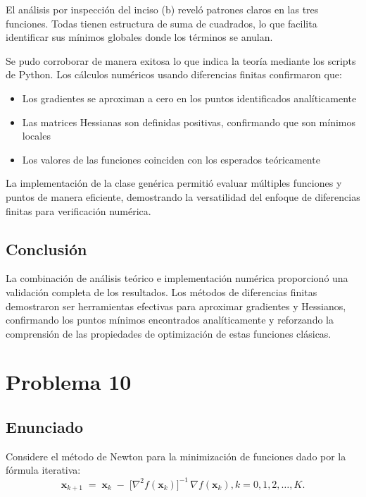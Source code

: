 \documentclass{article}
\begin{document}
El análisis por inspección del inciso (b) reveló patrones claros en las tres funciones. Todas tienen estructura de suma de cuadrados, lo que facilita identificar sus mínimos globales donde los términos se anulan.

Se pudo corroborar de manera exitosa lo que indica la teoría mediante los scripts de Python. Los cálculos numéricos usando diferencias finitas confirmaron que:
\begin{itemize}
    \item Los gradientes se aproximan a cero en los puntos identificados analíticamente
    \item Las matrices Hessianas son definidas positivas, confirmando que son mínimos locales
    \item Los valores de las funciones coinciden con los esperados teóricamente
\end{itemize}

La implementación de la clase genérica permitió evaluar múltiples funciones y puntos de manera eficiente, demostrando la versatilidad del enfoque de diferencias finitas para verificación numérica.

\subsection{Conclusión}

La combinación de análisis teórico e implementación numérica proporcionó una validación completa de los resultados. Los métodos de diferencias finitas demostraron ser herramientas efectivas para aproximar gradientes y Hessianos, confirmando los puntos mínimos encontrados analíticamente y reforzando la comprensión de las propiedades de optimización de estas funciones clásicas.

\section{Problema 10}

\subsection{Enunciado}
Considere el método de Newton para la minimización de funciones dado por la fórmula iterativa:
\begin{equation*}
    \mathbf{x}_{k+1} \;=\; \mathbf{x}_{k} \;-\; \bigl[\nabla^{2} f(\mathbf{x}_{k})\bigr]^{-1}\,\nabla f(\mathbf{x}_{k}), k=0,1,2,\dots,K.
\end{equation*}
\end{document}
